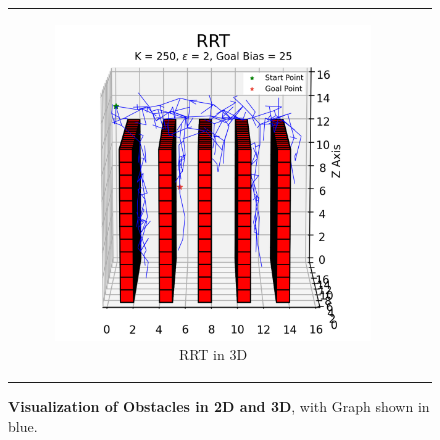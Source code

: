 \begin{figure}[H]
\begin{centering}
\begin{tabular}{cc}
    \begin{subfigure}{0.5\linewidth}
    \includegraphics[width=\linewidth]{chapters/chapter2/img/visualizing/tree3d.png}
    \caption{RRT in 3D}
    \end{subfigure} \\

\end{tabular}
\caption[Complete Visualization of RRT in 2D and 3D]{\textbf{Visualization of Obstacles in 2D and 3D}, with Graph shown in blue.}
\label{fig:rrt_full}
\end{centering}
\end{figure}